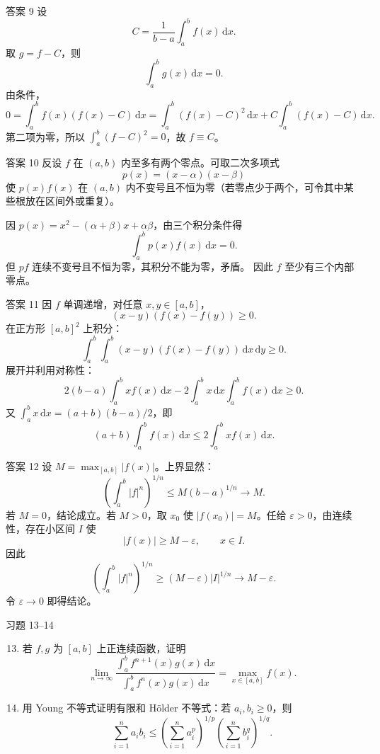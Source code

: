 ﻿\documentclass[aspectratio=169,11pt]{ctexbeamer}
\newcommand{\dd}{\,\mathrm{d}}
\newcommand{\abs}[1]{\left|#1\right|}
\begin{document}
\begin{frame}{答案 9}
  设
  \[
    C=\frac1{b-a}\int_a^b f(x)\dd x.
  \]
  取 $g=f-C$，则
  \[
    \int_a^b g(x)\dd x=0.
  \]
  由条件，
  \[
    0=\int_a^b f(x)(f(x)-C)\dd x
    =\int_a^b (f(x)-C)^2\dd x
      +C\int_a^b(f(x)-C)\dd x.
  \]
  第二项为零，所以 $\int_a^b(f-C)^2=0$，故 $f\equiv C$。
\end{frame}

\begin{frame}{答案 10}
  反设 $f$ 在 $(a,b)$ 内至多有两个零点。可取二次多项式
  \[
    p(x)=(x-\alpha)(x-\beta)
  \]
  使 $p(x)f(x)$ 在 $(a,b)$ 内不变号且不恒为零（若零点少于两个，可令其中某些根放在区间外或重复）。

  因 $p(x)=x^2-(\alpha+\beta)x+\alpha\beta$，由三个积分条件得
  \[
    \int_a^b p(x)f(x)\dd x=0.
  \]
  但 $p f$ 连续不变号且不恒为零，其积分不能为零，矛盾。
  因此 $f$ 至少有三个内部零点。
\end{frame}

\begin{frame}{答案 11}
  因 $f$ 单调递增，对任意 $x,y\in[a,b]$，
  \[
    (x-y)(f(x)-f(y))\ge0.
  \]
  在正方形 $[a,b]^2$ 上积分：
  \[
    \int_a^b\int_a^b (x-y)(f(x)-f(y))\dd x\dd y\ge0.
  \]
  展开并利用对称性：
  \[
    2(b-a)\int_a^b x f(x)\dd x
    -2\int_a^b x\dd x\int_a^b f(x)\dd x\ge0.
  \]
  又 $\int_a^b x\dd x=(a+b)(b-a)/2$，即
  \[
    (a+b)\int_a^b f(x)\dd x\le2\int_a^b x f(x)\dd x.
  \]
\end{frame}

\begin{frame}{答案 12}
  设 $M=\max_{[a,b]}\abs{f(x)}$。上界显然：
  \[
    \left(\int_a^b\abs{f}^n\right)^{1/n}
    \le M(b-a)^{1/n}\to M.
  \]
  若 $M=0$，结论成立。若 $M>0$，取 $x_0$ 使 $\abs{f(x_0)}=M$。任给 $\varepsilon>0$，由连续性，存在小区间 $I$ 使
  \[
    \abs{f(x)}\ge M-\varepsilon,\qquad x\in I.
  \]
  因此
  \[
    \left(\int_a^b\abs{f}^n\right)^{1/n}
    \ge (M-\varepsilon)|I|^{1/n}\to M-\varepsilon.
  \]
  令 $\varepsilon\to0$ 即得结论。
\end{frame}

\begin{frame}{习题 13--14}
  \begin{enumerate}
    \setcounter{enumi}{12}
    \item 若 $f,g$ 为 $[a,b]$ 上正连续函数，证明
    \[
      \lim_{n\to\infty}
      \frac{\int_a^b f^{n+1}(x)g(x)\dd x}
           {\int_a^b f^n(x)g(x)\dd x}
      =\max_{x\in[a,b]}f(x).
    \]
    \item 用 Young 不等式证明有限和 Hölder 不等式：若 $a_i,b_i\ge0$，则
    \[
      \sum_{i=1}^{n}a_i b_i
      \le\left(\sum_{i=1}^{n}a_i^p\right)^{1/p}
       \left(\sum_{i=1}^{n}b_i^q\right)^{1/q}.
    \]
  \end{enumerate}
\end{frame}
\end{document}

